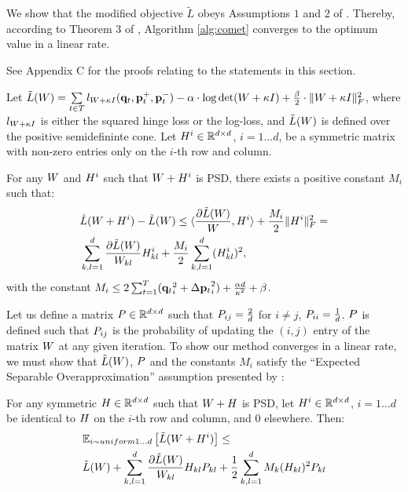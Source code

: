 \documentclass{article}
\begin{document}
We show that the modified objective $\tilde{L}$ obeys Assumptions $1$ and $2$ of \citet{richtarik2013optimal}. Thereby, according to Theorem 3 of \citeauthor{richtarik2013optimal}, Algorithm \ref{alg:comet} converges to the optimum value in a linear rate.

See Appendix C for the proofs relating to the statements in this section.
\begin{lemma}
\label{lem:smooth}
Let $\tilde{L}({W})=\sum\limits_{t\in T}{l_{{W} + \kappa I}(\mathbf{q}_t, \mathbf{p}_{t}^{+}, \mathbf{p}_{t}^{-})} - \alpha \cdot \log \det({W} + \kappa I) + \tfrac{\beta}{2}  \cdot \| {W} + \kappa I \|_{F}^{2}$, 
where $l_{{W} + \kappa I}$ is either the squared hinge loss or the log-loss, and $\tilde{L}({W})$ is defined over the positive semidefininte cone. 
Let ${H}^i \in \mathbb{R}^{d \times d}$, $i=1 \ldots d$, be a symmetric matrix with non-zero entries only on the $i$-th row and column.

For any ${W}$ and ${H}^i$ such that ${W} + {H}^i$ is PSD, there exists a positive constant $M_i$ such that:
\begin{align}
\label{eq:ineq}
&\tilde{L}({W} + {H}^i) - \tilde{L}({W}) \leq  \langle \frac{\partial \tilde{L}({W})}{{W}}, {H}^i \rangle + \frac{M_i}{2} {\|{H}^i\|_F^2} = \\
& \sum_{k,l=1}^d  \frac{\partial \tilde{L}({W})}{{W}_{kl}} {H}_{kl}^i + \frac{M_i}{2} \sum_{k,l=1}^d  ({H}_{kl}^i)^2, \nonumber
\end{align}
with the constant $M_i \leq  2 \sum_{t=1}^T ({{\mathbf{q}}_{{t}}}_i^2 +{\Delta\mathbf{p}_{t}}_i^2) + \frac{\alpha d}{\kappa ^2} + \beta$.

\end{lemma}

Let us define a matrix ${P} \in \mathbb{R}^{d \times d}$ such that ${P}_{ij} = \frac{2}{d}$ for $i \ne j$, ${P}_{ii} = \frac{1}{d}$. ${P}$ is defined such that ${P}_{ij}$ is the probability of updating the $(i,j)$ entry of the matrix ${W}$ at any given iteration. To show our method converges in a linear rate, we must show that $\tilde{L}({W})$, ${P}$ and the constants $M_i$ satisfy the ``Expected Separable Overapproximation'' assumption presented by \citet{richtarik2013optimal}:

\begin{lemma}\label{lem:ESO}
For any symmetric ${H} \in \mathbb{R}^{d \times d}$ such that ${W} + {H}$ is PSD, let ${H}^i \in \mathbb{R}^{d \times d}$, $i=1 \ldots d$ be identical to ${H}$  on the $i$-th row and column, and $0$ elsewhere. Then:
\begin{align*}
&\mathbb{E}_{i \sim uniform 1 \ldots d} \left[ \tilde{L}({W} + {H}^i) \right] \leq \\
&\tilde{L}({W}) + \sum_{k,l=1}^d  \frac{\partial \tilde{L}({W})}{{W}_{kl}} {H}_{kl} {P}_{kl} + \frac{1}{2} \sum_{k,l=1}^d   M_k ({H}_{kl})^2 {P}_{kl}
\end{align*}
\end{lemma}
\end{document}
